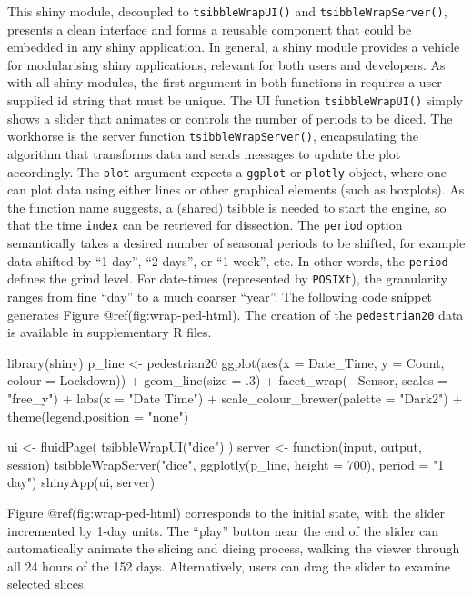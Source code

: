 This shiny module, decoupled to \texttt{tsibbleWrapUI()} and
\texttt{tsibbleWrapServer()}, presents a clean interface and forms a
reusable component that could be embedded in any shiny application. In
general, a shiny module provides a vehicle for modularising shiny
applications, relevant for both users and developers. As with all shiny
modules, the first argument in both functions in 
requires a user-supplied id string that must be unique. The UI function
\texttt{tsibbleWrapUI()} simply shows a slider that animates or controls
the number of periods to be diced. The workhorse is the server function
\texttt{tsibbleWrapServer()}, encapsulating the algorithm that
transforms data and sends messages to update the plot accordingly. The
\texttt{plot} argument expects a \texttt{ggplot} or \texttt{plotly}
object, where one can plot data using either lines or other graphical
elements (such as boxplots). As the function name suggests, a (shared)
tsibble is needed to start the engine, so that the time \texttt{index}
can be retrieved for dissection. The \texttt{period} option semantically
takes a desired number of seasonal periods to be shifted, for example
data shifted by ``1 day'', ``2 days'', or ``1 week'', etc. In other
words, the \texttt{period} defines the grind level. For date-times
(represented by \texttt{POSIXt}), the granularity ranges from fine
``day'' to a much coarser ``year''. The following code snippet generates
Figure @ref(fig:wrap-ped-html). The creation of the
\texttt{pedestrian20} data is available in supplementary R files.

\begin{Schunk}
\begin{Sinput}
library(shiny)
p_line <- pedestrian20 %
  ggplot(aes(x = Date_Time, y = Count, colour = Lockdown)) +
  geom_line(size = .3) +
  facet_wrap(~ Sensor, scales = "free_y") +
  labs(x = "Date Time") +
  scale_colour_brewer(palette = "Dark2") +
  theme(legend.position = "none")

ui <- fluidPage(
  tsibbleWrapUI("dice")
)
server <- function(input, output, session) {
  tsibbleWrapServer("dice", ggplotly(p_line, height = 700), period = "1 day")
}
shinyApp(ui, server)
\end{Sinput}
\end{Schunk}

Figure @ref(fig:wrap-ped-html) corresponds to the initial state, with
the slider incremented by 1-day units. The ``play'' button near the end
of the slider can automatically animate the slicing and dicing process,
walking the viewer through all 24 hours of the 152 days. Alternatively,
users can drag the slider to examine selected slices.

